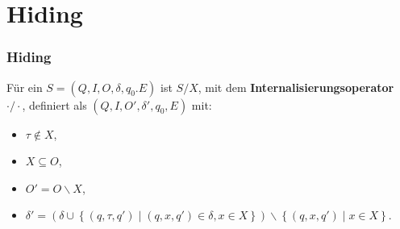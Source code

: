 \section{Hiding}
\begin{frame}
  \frametitle{Hiding}
  \begin{Def}[Internalisierungsoperator]
    Für ein \EIO{} $S=(Q,I,O,\delta ,q_0.E)$ ist $S/X$, mit
    dem \textbf{Internalisierungsoperator} $\cdot /\cdot$,
    definiert als $(Q,I,O',\delta ', q_0,E)$ mit:
    \begin{itemize}
      \item $\tau \notin X$,
      \item $X\subseteq O$,
      \item $O'=O\backslash X$,
      \item $\delta '=\left(\delta\cup\left\{(q,\tau ,q')\mid (q,x,q')\in\delta
        ,x\in X\right\}\right)\backslash \left\{(q,x,q')\mid x\in X\right\}$.
    \end{itemize}
  \end{Def}
\end{frame}
